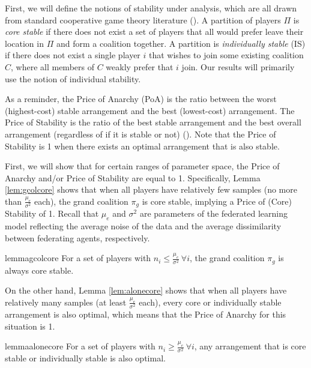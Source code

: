 \documentclass{article}
\newcommand{\mue}[0]{\ensuremath{\mu_e}}
\newcommand{\var}[0]{\ensuremath{\sigma^2}}
\newcommand{\ndraw}[0]{\ensuremath{n}}
\newcommand{\gcol}[0]{\ensuremath{\pi_g}}
\newcommand{\col}[0]{\ensuremath{C}}
\newcommand{\partition}[0]{\ensuremath{\Pi}}
\begin{document}
First, we will define the notions of stability under analysis, which are all drawn from standard cooperative game theory literature (\cite{BOGOMOLNAIA2002201}). A partition of players $\partition$ is \emph{core stable} if there does not exist a set of players that all would prefer leave their location in $\partition$ and form a coalition together. A partition is \emph{individually stable} (IS) if there does not exist a single player $i$ that wishes to join some existing coalition $\col$, where all members of $\col$ weakly prefer that $i$ join. Our results will primarily use the notion of individual stability. %

As a reminder, the Price of Anarchy (PoA) is the ratio between the worst (highest-cost) stable arrangement and the best (lowest-cost) arrangement. The Price of Stability is the ratio of the best stable arrangement and the best overall arrangement (regardless of if it is stable or not) (\cite{anshelevich2008price}). Note that the Price of Stability is 1 when there exists an optimal arrangement that is also stable. 

First, we will show that for certain ranges of parameter space, the Price of Anarchy and/or Price of Stability are equal to 1. Specifically, Lemma \ref{lem:gcolcore} shows that when all players have relatively few samples (no more than $\frac{\mue}{\var}$ each), the grand coalition $\gcol$ is core stable, implying a Price of (Core) Stability of 1. Recall that $\mue$ and $\var$ are parameters of the federated learning model reflecting the average noise of the data and the average dissimilarity between federating agents, respectively. 

\begin{restatable}{lemma}{gcolcore}
\label{lem:gcolcore}
For a set of players with $\ndraw_i \leq \frac{\mue}{\var} \ \forall i$, the grand coalition $\gcol$ is always core stable. 
\end{restatable}

On the other hand, Lemma \ref{lem:alonecore} shows that  when all players have relatively many samples (at least $ \frac{\mue}{\var}$ each), every core or individually stable arrangement is also optimal, which means that the Price of Anarchy for this situation is 1.  

\begin{restatable}{lemma}{alonecore}
\label{lem:alonecore}
For a set of players with $\ndraw_i \geq \frac{\mue}{\var} \ \forall i$, any arrangement that is core stable or individually stable is also optimal. 
\end{restatable}
\end{document}
